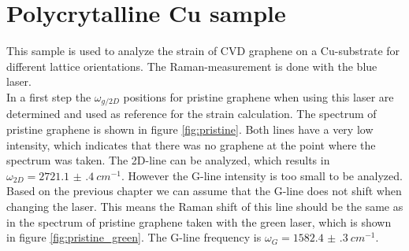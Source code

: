 \documentclass[12pt,a4paper]{article}
\begin{document}
\section{Polycrytalline Cu sample}
\label{sec:8}
This sample is used to analyze the strain of CVD graphene on a Cu-substrate for different lattice orientations. The Raman-measurement is done with the blue laser.\\ In a first step the $\omega_{g/2D}$ positions for pristine graphene when using this laser are determined and used as reference for the strain calculation. The spectrum of pristine graphene is shown in figure \ref{fig:pristine}. Both lines have a very low intensity, which indicates that there was no graphene at the point where the spectrum was taken. The 2D-line can be analyzed, which results in  $\omega_{2D} = \SI{2721.1(4)}{cm^{-1}}$. However the G-line intensity is too small to be analyzed. Based on the previous chapter we can assume that the G-line does not shift when changing the laser. This means the Raman shift of this line should be the same as in the spectrum of pristine graphene taken with the green laser, which is shown in figure \ref{fig:pristine_green}. The G-line frequency is $\omega_{G} = \SI{1582.4(3)}{cm^{-1}}$.\\
\end{document}

